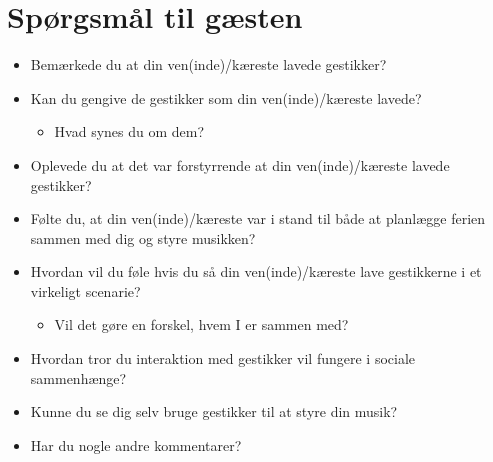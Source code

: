 \section{Spørgsmål til gæsten}
\label{app:ExitInterviewGaest}
%
\begin{itemize}
  \item Bemærkede du at din ven(inde)/kæreste lavede gestikker? 
  \item Kan du gengive de gestikker som din ven(inde)/kæreste lavede?
  \begin{itemize}
  \item Hvad synes du om dem? 
\end{itemize}
  \item Oplevede du at det var forstyrrende at din ven(inde)/kæreste lavede gestikker? 
  \item Følte du, at din ven(inde)/kæreste var i stand til både at planlægge ferien sammen med dig og styre musikken?
  \item Hvordan vil du føle hvis du så din ven(inde)/kæreste lave gestikkerne i et virkeligt scenarie?
   \begin{itemize}
  \item Vil det gøre en forskel, hvem I er sammen med?
\end{itemize}
  \item Hvordan tror du interaktion med gestikker vil fungere i sociale sammenhænge? 
  \item Kunne du se dig selv bruge gestikker til at styre din musik?
  \item Har du nogle andre kommentarer?
\end{itemize}



 